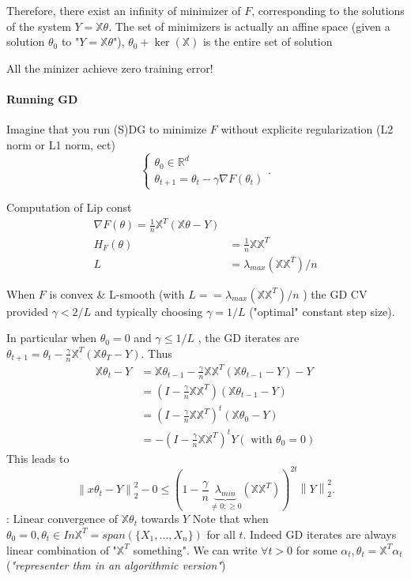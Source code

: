 Therefore, there exist an infinity of minimizer of $ F $, corresponding to the solutions of the system $ Y = \mathbb{X} \theta $. The set of minimizers is actually an affine space (given a solution $ \theta _0 $ to "$ Y = \mathbb{X} \theta  $"), $ \theta _0 + \ker (\mathbb{X}) $ is the entire set of solution
\begin{note}[]
    All the minizer achieve zero training error!
\end{note}

\paragraph{Running GD} Imagine that you run (S)DG to minimize $ F $ without explicite regularization (L2 norm or L1 norm, ect)
\[
    \begin{cases}
        \theta _0 \in \mathbb{R }^d\\
        \theta _{t+1} = \theta _t - \gamma \nabla F(\theta _t)
    \end{cases}
.\]
\begin{note}[]
    Computation of Lip const \begin{align*}
        \nabla F(\theta ) = \frac{1 }{n } \mathbb{X}^T (\mathbb{X} \theta - Y) \\
        H_F (\theta ) &= \frac{1}{n} \mathbb{X} \mathbb{X}^T \\
        L &= \lambda _{max} (\mathbb{X} \mathbb{X} ^T) / n
    \end{align*}
\end{note}
When $ F $ is convex \& L-smooth (with $ L= = \lambda _{max} (\mathbb{X} \mathbb{X} ^T) / n $ ) the GD CV provided $ \gamma < 2 / L $ and typically choosing $ \gamma = 1/L $ ("optimal" constant step size).

In particular when $ \theta _0 = 0 $ and $ \gamma \leq 1/L $ , the GD iterates are $ \theta _{t+1} = \theta _t - \frac{\gamma }{n } \mathbb{X}^T ( \mathbb{X } \theta _T - Y) $. Thus 
\begin{align*}
    \mathbb{X} \theta _t - Y 
        &= \mathbb{X} \theta _{t-1} - \frac{\gamma }{n }\mathbb{X} \mathbb{X}^T (\mathbb{X} \theta _{t-1} - Y) - Y \\
        &= (I - \frac{\gamma }{n } \mathbb{X} \mathbb{X}^T) (\mathbb{X} \theta _{t - 1} - Y) \\
        &= ( I - \frac{\gamma }{n } \mathbb{X} \mathbb{X}^T)^t (\mathbb{X} \theta _0 - Y) \\
        &= - ( I - \frac{\gamma  }{n } \mathbb{X} \mathbb{X} ^T )^t Y (\text{ with } \theta _0 = 0)
\end{align*}
This leads to  
\[
    \left\| x \theta _t - Y  \right\| _2 ^2 - 0 \leq (1 - \frac{\gamma }{n } \underbrace{\lambda _{min}}_{\neq 0 ; \geq 0} (\mathbb{X} \mathbb{X}^T))^{2t} \left\| Y \right\| _2 ^2
.\]
\texttimes: Linear convergence of $ \mathbb{X} \theta _t  $ towards $ Y $ Note that when $ \theta _0 = 0, \theta _t \in In \mathbb{X}^T = span(\{X_1, \dots, X_n\}) $ for all $ t $. Indeed GD iterates are always linear combination of "$ \mathbb{X}^T  $ something". We can write $ \forall t > 0  $ for some $ \alpha _t, \theta _t = \mathbb{X} ^T \alpha _t $  (\textit{"representer thm in an algorithmic version"})

